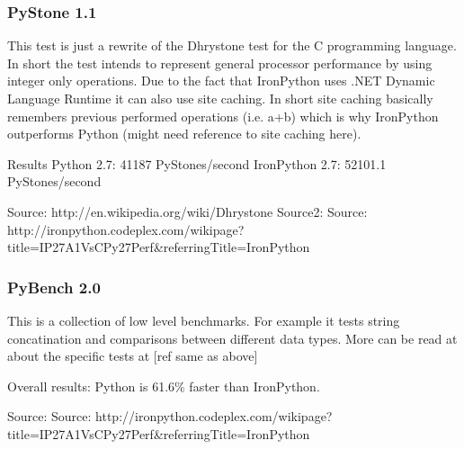 \subsubsection{PyStone 1.1}
This test is just a rewrite of the Dhrystone test for the C programming language. In short the test intends to represent general processor performance by using integer only operations. 
Due to the fact that IronPython uses .NET Dynamic Language Runtime it can also use site caching. In short site caching basically remembers previous performed operations (i.e. a+b) which is why IronPython outperforms Python (might need reference to site caching here). 

Results
Python 2.7: 41187 PyStones/second
IronPython 2.7: 52101.1 PyStones/second

Source: http://en.wikipedia.org/wiki/Dhrystone
Source2: Source: http://ironpython.codeplex.com/wikipage?title=IP27A1VsCPy27Perf&referringTitle=IronPython%

\subsubsection{PyBench 2.0}
This is a collection of low level benchmarks. For example it tests string concatination and comparisons between different data types. More can be read at about the specific tests at [ref same as above]

Overall results: Python is 61.6\% faster than IronPython.

Source: Source: http://ironpython.codeplex.com/wikipage?title=IP27A1VsCPy27Perf&referringTitle=IronPython%














